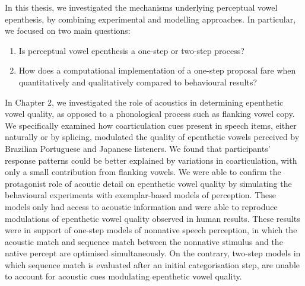 
In this thesis, we investigated the mechanisms underlying perceptual vowel epenthesis, by combining experimental and modelling approaches. In particular, we focused on two main questions:
\begin{enumerate}
\item Is perceptual vowel epenthesis a one-step or two-step process?
\item How does a computational implementation of a one-step proposal fare when quantitatively and qualitatively compared to behavioural results? 
\end{enumerate}

In Chapter 2, we investigated the role of acoustics in determining epenthetic vowel quality, as opposed to a phonological process such as flanking vowel copy. We specifically examined how coarticulation cues present in speech items, either naturally or by splicing, modulated the quality of epenthetic vowels perceived by Brazilian Portuguese and Japanese listeners. We found that participants' response patterns could be better explained by variations in coarticulation, with only a small contribution from flanking vowels. We were able to confirm the protagonist role of acoutic detail on epenthetic vowel quality by simulating the behavioural experiments with exemplar-based models of perception. These models only had access to acoustic information and were able to reproduce modulations of epenthetic vowel quality observed in human results. These results were in support of one-step models of nonnative speech perception, in which the acoustic match and sequence match between the nonnative stimulus and the native percept are optimised simultaneously. On the contrary, two-step models in which sequence match is evaluated after an initial categorisation step, are unable to account for acoustic cues modulating epenthetic vowel quality.    \\


